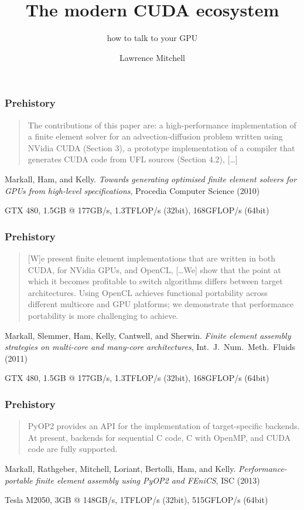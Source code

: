 \documentclass[aspectratio=169]{beamer}
\title{The modern CUDA ecosystem}
\subtitle{how to talk to your GPU}
\author{Lawrence Mitchell}
\institute{\texttt{lmitchell@nvidia.com}}
\begin{document}
\maketitle

\begin{frame}
  \frametitle{Prehistory}
  \begin{quote}
    The contributions of this paper are: a high-performance
    implementation of a finite element solver for an
    advection-diffusion problem written using NVidia CUDA (Section 3),
    a prototype implementation of a compiler that generates CUDA code
    from UFL sources (Section 4.2), [\dots]
  \end{quote}
  {
    \scriptsize
    \raggedleft
    Markall, Ham, and Kelly.
    \emph{Towards generating optimised finite
      element solvers for GPUs from high-level specifications},
    Procedia Computer Science (2010)
    \par
    GTX 480, 1.5GB @ 177GB/s, 1.3TFLOP/s (32bit), 168GFLOP/s (64bit)
    \par
  }
\end{frame}
\begin{frame}
  \frametitle{Prehistory}
  \begin{quote}
    [W]e present finite element implementations that are
    written in both CUDA, for NVidia GPUs, and OpenCL, [\dots We] show
    that the point at which it becomes profitable to switch algorithms
    differs between target architectures. Using OpenCL achieves
    functional portability across different multicore and GPU
    platforms; we demonstrate that performance portability is more
    challenging to achieve.
  \end{quote}
  {
    \scriptsize
    \raggedleft
    Markall, Slemmer, Ham, Kelly, Cantwell, and Sherwin.
    \emph{Finite element assembly strategies on multi-core and many-core architectures},
    Int.~J.~Num.~Meth.~Fluids (2011)
    \par
    \vspace{\baselineskip}
    GTX 480, 1.5GB @ 177GB/s, 1.3TFLOP/s (32bit), 168GFLOP/s (64bit)
    \par
  }
\end{frame}

\begin{frame}
  \frametitle{\textcolor{black!40}{Pre}history}
  \begin{quote}
    PyOP2 provides an API for the implementation of target-specific
    backends. At present, backends for sequential C code, C with
    OpenMP, and CUDA code are fully supported.
  \end{quote}
  {
    \scriptsize
    \raggedleft
    Markall, Rathgeber, Mitchell, Loriant, Bertolli, Ham, and Kelly.
    \emph{Performance-portable finite element assembly using PyOP2 and FEniCS},
    ISC (2013)
    \par
    Tesla M2050, 3GB @ 148GB/s, 1TFLOP/s (32bit), 515GFLOP/s (64bit)
    \par
  }
\end{frame}
\end{document}
